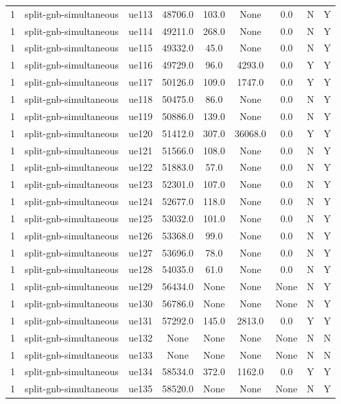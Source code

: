 \begin{table}[ht]
\begin{tabular}{|c|c|c|c|c|c|c|c|c|}
1 & split-gnb-simultaneous & ue113 & 48706.0 & 103.0 & None & 0.0 & N & Y \\
1 & split-gnb-simultaneous & ue114 & 49211.0 & 268.0 & None & 0.0 & N & Y \\
1 & split-gnb-simultaneous & ue115 & 49332.0 & 45.0 & None & 0.0 & N & Y \\
1 & split-gnb-simultaneous & ue116 & 49729.0 & 96.0 & 4293.0 & 0.0 & Y & Y \\
1 & split-gnb-simultaneous & ue117 & 50126.0 & 109.0 & 1747.0 & 0.0 & Y & Y \\
1 & split-gnb-simultaneous & ue118 & 50475.0 & 86.0 & None & 0.0 & N & Y \\
1 & split-gnb-simultaneous & ue119 & 50886.0 & 139.0 & None & 0.0 & N & Y \\
1 & split-gnb-simultaneous & ue120 & 51412.0 & 307.0 & 36068.0 & 0.0 & Y & Y \\
1 & split-gnb-simultaneous & ue121 & 51566.0 & 108.0 & None & 0.0 & N & Y \\
1 & split-gnb-simultaneous & ue122 & 51883.0 & 57.0 & None & 0.0 & N & Y \\
1 & split-gnb-simultaneous & ue123 & 52301.0 & 107.0 & None & 0.0 & N & Y \\
1 & split-gnb-simultaneous & ue124 & 52677.0 & 118.0 & None & 0.0 & N & Y \\
1 & split-gnb-simultaneous & ue125 & 53032.0 & 101.0 & None & 0.0 & N & Y \\
1 & split-gnb-simultaneous & ue126 & 53368.0 & 99.0 & None & 0.0 & N & Y \\
1 & split-gnb-simultaneous & ue127 & 53696.0 & 78.0 & None & 0.0 & N & Y \\
1 & split-gnb-simultaneous & ue128 & 54035.0 & 61.0 & None & 0.0 & N & Y \\
1 & split-gnb-simultaneous & ue129 & 56434.0 & None & None & None & N & Y \\
1 & split-gnb-simultaneous & ue130 & 56786.0 & None & None & None & N & Y \\
1 & split-gnb-simultaneous & ue131 & 57292.0 & 145.0 & 2813.0 & 0.0 & Y & Y \\
1 & split-gnb-simultaneous & ue132 & None & None & None & None & N & N \\
1 & split-gnb-simultaneous & ue133 & None & None & None & None & N & N \\
1 & split-gnb-simultaneous & ue134 & 58534.0 & 372.0 & 1162.0 & 0.0 & Y & Y \\
1 & split-gnb-simultaneous & ue135 & 58520.0 & None & None & None & N & Y \\

\end{tabular}
\end{table}
